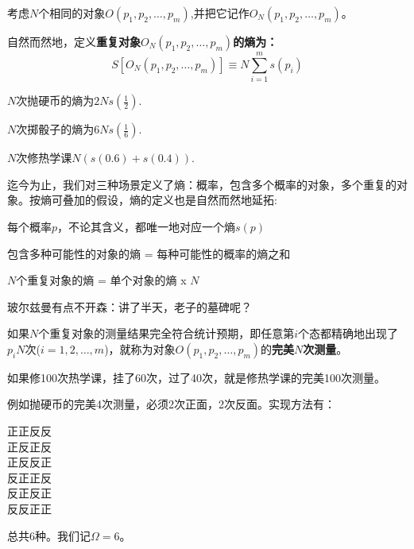 \documentclass[CJK]{beamer}
\begin{document}
\begin{frame}
\bch
{\small 考虑$N$个相同的对象$O(p_1, p_2, \ldots, p_m)$,并把它记作$O_N(p_1, p_2, \ldots, p_m)$。


自然而然地，定义{\blue \bf 重复对象$O_N(p_1, p_2, \ldots, p_m)$的熵为：
$$S\left[O_N(p_1, p_2, \ldots, p_m)\right] \equiv N \sum_{i=1}^m  s(p_i)$$
}}

\bex
{\small
$N$次抛硬币的熵为$2Ns(\frac{1}{2})$.

\skipline

$N$次掷骰子的熵为$6Ns(\frac{1}{6})$.

\skipline

$N$次修热学课$N\left(s(0.6)+s(0.4)\right)$.}

\eex

\ech
\end{frame}


\begin{frame}
\bch
迄今为止，我们对三种场景定义了熵：概率，包含多个概率的对象，多个重复的对象。按熵可叠加的假设，熵的定义也是自然而然地延拓:
\bitem
\item{每个概率$p$，不论其含义，都唯一地对应一个熵$s(p)$}
\item{包含多种可能性的对象的熵 = 每种可能性的概率的熵之和}
\item{$N$个重复对象的熵 = 单个对象的熵 x $N$}
\eitem

\skiplines

\emini
{}
玻尔兹曼有点不开森：讲了半天，老子的墓碑呢？
\emini

\ech
\end{frame}


\begin{frame}
\bch
如果$N$个重复对象的测量结果完全符合统计预期，即任意第$i$个态都精确地出现了$p_i N$次($i=1,2,\ldots,m$)，就称为对象$O(p_1, p_2, \ldots, p_m)$的{\bf \blue 完美$N$次测量}。

\skipline


\bex

如果修100次热学课，挂了60次，过了40次，就是修热学课的完美100次测量。

\eex


\ech
\end{frame}


\begin{frame}
\bch
例如抛硬币的完美4次测量，必须2次正面，2次反面。实现方法有：

\begin{center}
正正反反 \\
正反正反 \\
正反反正 \\
反正正反 \\
反正反正 \\
反反正正
\end{center}

总共6种。我们记$\Omega= 6$。

\ech
\end{frame}
\end{document}
